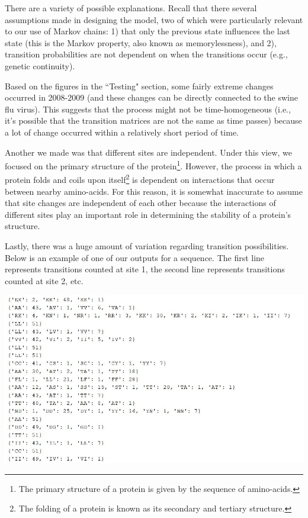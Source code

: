 \documentclass[12pt]{article}
\newenvironment{Figure}
  {\par\medskip\noindent\minipage{\linewidth}}
  {\endminipage\par\medskip}
\begin{document}
\begin{multicols}{2}
There are a variety of possible explanations. Recall that there several assumptions made in designing the model, two of which were particularly relevant to our use of Markov chains: 1) that only the previous state influences the last state (this is the Markov property, also known as memorylessness), and 2), transition probabilities are not dependent on when the transitions occur (e.g., genetic continuity).

Based on the figures in the ``Testing" section, some fairly extreme changes occurred in 2008-2009 (and these changes can be directly connected to the swine flu virus). This suggests that the process might not be time-homogeneous (i.e., it's possible that the transition matrices are not the same as time passes) because a lot of change occurred within a relatively short period of time.

Another we made was that different sites are independent. Under this view, we focused on the primary structure of the protein\footnote{The primary structure of a protein is given by the sequence of amino-acids.}. However, the process in which a protein folds and coils upon itself\footnote{The folding of a protein is known as its secondary and tertiary structure.} is dependent on interactions that occur between nearby amino-acids. For this reason, it is somewhat inaccurate to assume that site changes are independent of each other because the interactions of different sites play an important role in determining the stability of a protein's structure.

Lastly, there was a huge amount of variation regarding transition possibilities. Below is an example of one of our outputs for a sequence. The first line represents transitions counted at site 1, the second line represents transitions counted at site 2, etc.

\begin{Figure}
 \centering
 \includegraphics[width=\linewidth]{transitiondictionary.JPG}
\end{Figure}


\end{multicols}
\end{document}
